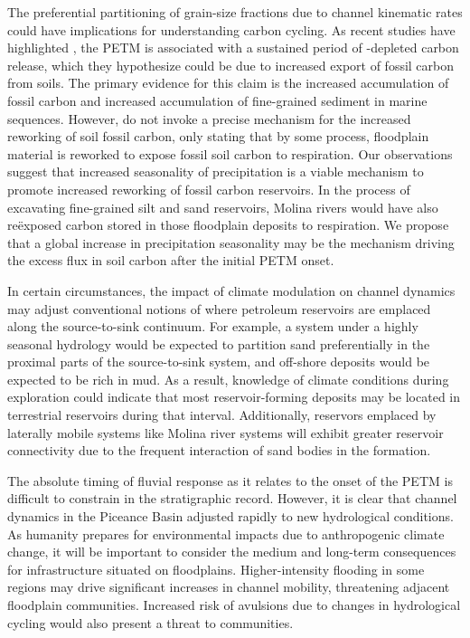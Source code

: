 \documentclass[draft]{compact_proposal}
\newcommand{\del}[3]{\ce{\delta^#1#2_{#3}}}
\begin{document}
The preferential partitioning of grain-size fractions due to channel kinematic rates could have implications for understanding carbon cycling.
As recent studies have highlighted \cnote[Lyons], the PETM is associated with a sustained period of \del{13}{C}{}-depleted carbon release, which they hypothesize could be due to increased export of fossil carbon from soils.
The primary evidence for this claim is the increased accumulation of fossil carbon and increased accumulation of fine-grained sediment in marine sequences.
However, \cnote[Lyons] do not invoke a precise mechanism for the increased reworking of soil fossil carbon, only stating that by some process, floodplain material is reworked to expose fossil soil carbon to respiration.
Our observations suggest that increased seasonality of precipitation is a viable mechanism to promote increased reworking of fossil carbon reservoirs.
In the process of excavating fine-grained silt and sand reservoirs, Molina rivers would have also re\"exposed carbon stored in those floodplain deposits to respiration.
We propose that a global increase in precipitation seasonality may be the mechanism driving the excess flux in soil carbon after the initial PETM onset.

In certain circumstances, the impact of climate modulation on channel dynamics may adjust conventional notions of where petroleum reservoirs are emplaced along the source-to-sink continuum.
For example, a system under a highly seasonal hydrology would be expected to partition sand preferentially in the proximal parts of the source-to-sink system, and off-shore deposits would be expected to be rich in mud.
As a result, knowledge of climate conditions during exploration could indicate that most reservoir-forming deposits may be located in terrestrial reservoirs during that interval.
Additionally, reservors emplaced by laterally mobile systems like Molina river systems will exhibit greater reservoir connectivity due to the frequent interaction of sand bodies in the formation.

The absolute timing of fluvial response as it relates to the onset of the PETM is difficult to constrain in the stratigraphic record.
However, it is clear that channel dynamics in the Piceance Basin adjusted rapidly to new hydrological conditions.
As humanity prepares for environmental impacts due to anthropogenic climate change, it will be important to consider the medium and long-term consequences for infrastructure situated on floodplains.
Higher-intensity flooding in some regions may drive significant increases in channel mobility, threatening adjacent floodplain communities.
Increased risk of avulsions due to changes in hydrological cycling would also present a threat to communities.
\end{document}
